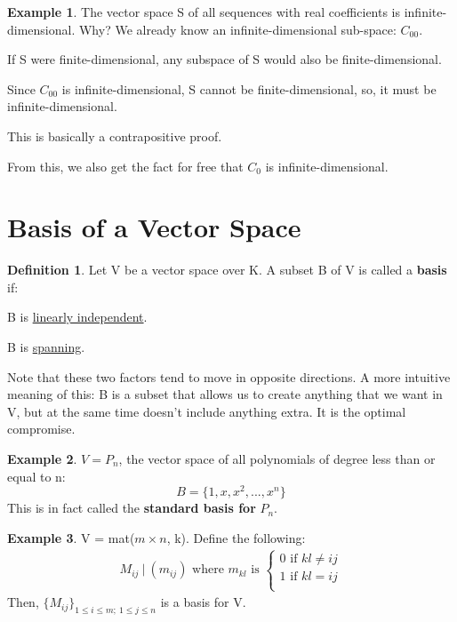 \documentclass[a4paper, 12pt]{article}
\theoremstyle{definition}
\newtheorem{exmp}{Example}[section]
\theoremstyle{definition}
\newtheorem{defn}{Definition}[section]
\theoremstyle{definition}
\theoremstyle{definition}
\newenvironment{enumerate_tight}{
	\begin{enumerate}
		\setlength{\itemsep}{0pt}
		\setlength{\parskip}{0pt}
	}{\end{enumerate}}
\newenvironment{itemize_tight}{
	\begin{itemize}
		\setlength{\itemsep}{0pt}
		\setlength{\parskip}{0pt}
	}{\end{itemize}}
\begin{document}
{\begin{exmp}
	The vector space S of all sequences with real coefficients is infinite-dimensional. Why? We already know an infinite-dimensional sub-space: $C_{00}$. 
	\begin{itemize_tight}
		\item If S were finite-dimensional, any subspace of S would also be finite-dimensional. 
		\item Since $C_{00}$ is infinite-dimensional, S cannot be finite-dimensional, so, it must be infinite-dimensional. 
		\item This is basically a contrapositive proof. 
		\item From this, we also get the fact for free that $C_0$ is infinite-dimensional. 
	\end{itemize_tight}
\end{exmp}

\section{Basis of a Vector Space}
\begin{defn}
	Let V be a vector space over K. A subset B of V is called a \textbf{basis} if: 
	\begin{enumerate_tight}
		\item B is \underline{linearly independent}. 
		\item B is \underline{spanning}. 
	\end{enumerate_tight}
Note that these two factors tend to move in opposite directions. A more intuitive meaning of this: B is a subset that allows us to create anything that we want in V, but at the same time doesn't include anything extra. It is the optimal compromise. 
\end{defn}

\begin{exmp}
	$V = P_n$, the vector space of all polynomials of degree less than or equal to n: 
	$$ B = \{ 1, x, x^2,..., x^n \} $$
	This is in fact called the \textbf{standard basis for} $P_n$. 
\end{exmp}

\begin{exmp}
	V = mat($m \times n$, k). Define the following: 
	\begin{align*}
		M_{ij}\ |\ (m_{ij}) \mbox{ where $m_{kl}$ is } \begin{cases}
			0 \mbox{ if } kl \neq ij \\
			1 \mbox{ if } kl = ij \\
		\end{cases}
	\end{align*}
	Then, $\{ M_{ij} \}_{1 \leq i \leq m;\ 1 \leq j \leq n}$ is a basis for V. 
\end{exmp}

}
\end{document}
